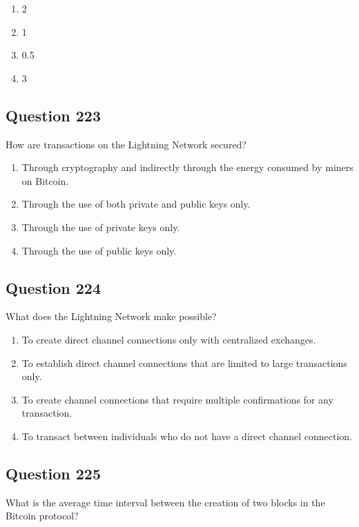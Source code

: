 \documentclass[12pt,a4paper]{article}
\begin{document}
\begin{enumerate}[label=\Alph*., leftmargin=*]
\item 2%
\item 1%
\item 0.5%
\item 3%
\end{enumerate}

\bigskip


\subsection*{Question 223}
How are transactions on the Lightning Network secured?

\begin{enumerate}[label=\Alph*., leftmargin=*]
\item Through cryptography and indirectly through the energy consumed by miners on Bitcoin.
\item Through the use of both private and public keys only.
\item Through the use of private keys only.
\item Through the use of public keys only.
\end{enumerate}

\bigskip


\subsection*{Question 224}
What does the Lightning Network make possible?

\begin{enumerate}[label=\Alph*., leftmargin=*]
\item To create direct channel connections only with centralized exchanges.
\item To establish direct channel connections that are limited to large transactions only.
\item To create channel connections that require multiple confirmations for any transaction.
\item To transact between individuals who do not have a direct channel connection.
\end{enumerate}

\bigskip


\subsection*{Question 225}
What is the average time interval between the creation of two blocks in the Bitcoin protocol?
\end{document}
